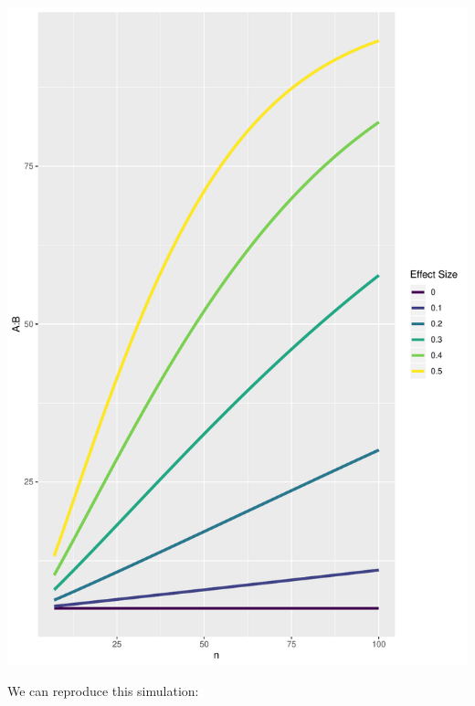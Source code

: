 \documentclass[]{book}
\begin{document}
\includegraphics{SuperpowerValidation_files/figure-latex/unnamed-chunk-151-1.pdf}

We can reproduce this simulation:
\end{document}
